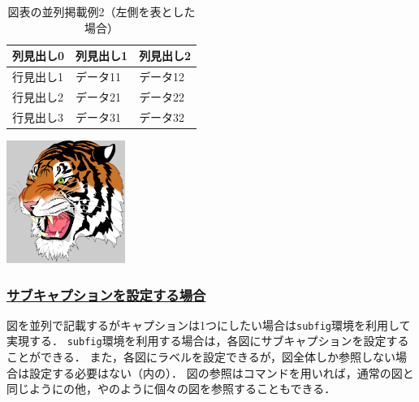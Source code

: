 \documentclass[a4j,11pt]{ujreport}
\begin{document}
\begin{description}
\begin{table}[ht]
	\centering
	\begin{minipage}[]{0.5\hsize}
		\centering 
		\caption{図表の並列掲載例2（左側を表とした場合）}
		\label{tab:ExampleParallelMixLeft2}
		\small
		\begin{tabular}{l|ll}
			\Hline 
			列見出し0 & 列見出し1 & 列見出し2\\ 
			\hline\hline
			行見出し1 & データ11 & データ12\\
			行見出し2 & データ21 & データ22\\
			行見出し3 & データ31 & データ32\\
			\hline 
		\end{tabular}
	\end{minipage}%
	\begin{minipage}[]{0.5\hsize}
		\centering
		\includegraphics[clip,height=4.0cm]{fig/tiger.pdf}
		\label{fig:ExampleParallelMixRight2}
	\end{minipage}
\end{table}

\end{description}

\subsubsection{\underline{サブキャプションを設定する場合}}
図を並列で記載するがキャプションは1つにしたい場合は\texttt{subfig}環境を利用して実現する．
\texttt{subfig}環境を利用する場合は，各図にサブキャプションを設定することができる．
また，各図にラベルを設定できるが，図全体しか参照しない場合は設定する必要はない（内の）．
図の参照はコマンドを用いれば，通常の図と同じようにの他，やのように個々の図を参照することもできる．
\end{document}

